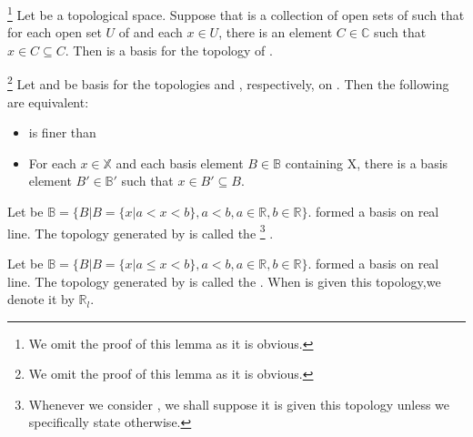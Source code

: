       \begin{lemma} \footnote{We omit the proof of this lemma as it is obvious.}
            Let  be a topological space. Suppose that  is a collection of open sets of  such that for each open set $ U $ of  and each $ x \in U $, there is an element $ C \in \mathbb{C} $ such that $ x \in C \subseteq C $. Then  is a basis for the topology of .
      \end{lemma}

      \begin{lemma} \footnote{We omit the proof of this lemma as it is obvious.}
            Let  and  be basis for the topologies  and , respectively, on . Then the following are equivalent:
            \begin{itemize}
                  \item {} is finer than 
                  \item For each $ x \in \mathbb{X} $ and each basis element $ B \in \mathbb{B} $ containing X, there is a basis element $ B' \in \mathbb{B'} $ such that $ x \in B' \subseteq B $.
            \end{itemize}
      \end{lemma}

      \begin{definition}\label{def:StandardTopologyOnTheRealLine}
            Let be $ \mathbb{B} = \{ B | B = \{ x | a < x < b \}, a < b, a \in \mathbb{R}, b \in \mathbb{R} \} $.  formed a basis on real line. The topology generated by  is called the  \footnote{
                  Whenever we consider , we shall suppose it is given this topology unless we specifically state otherwise.
            } .
      \end{definition}

      \begin{definition}\label{def:LowerLimitTopologyOnTheRealLine}
            Let be $ \mathbb{B} = \{ B | B = \{ x | a \le x < b \}, a < b, a \in \mathbb{R}, b \in \mathbb{R} \} $.  formed a basis on real line. The topology generated by  is called the . When  is given this topology,we denote it by $ \mathbb{R}_{l} $.
      \end{definition}

